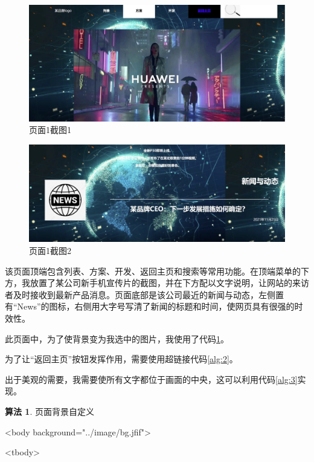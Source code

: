 \documentclass[supercite]{Experimental_Report}
\theoremstyle{definition}
\newtheorem{alg}{算法}[section]
\begin{document}
	\begin{figure}[htb]
		\begin{center}
			\includegraphics[scale=0.43]{images/3-1.jpg}
			\caption{页面1截图1}
			\label{fig3-1}
		\end{center}
	\end{figure}

    \begin{figure}[htb]
    	\begin{center}
    		\includegraphics[scale=0.43]{images/3-2.jpg}
    		\caption{页面1截图2}
    		\label{fig3-2}
    	\end{center}
    \end{figure}
	
	该页面顶端包含列表、方案、开发、返回主页和搜索等常用功能。在顶端菜单的下方，我放置了某公司新手机宣传片的截图，并在下方配以文字说明，让网站的来访者及时接收到最新产品消息。页面底部是该公司最近的新闻与动态，左侧置有“News”的图标，右侧用大字号写清了新闻的标题和时间，使网页具有很强的时效性。
	
    此页面中，为了使背景变为我选中的图片，我使用了代码\ref{alg:1}。
    
    为了让“返回主页”按钮发挥作用，需要使用超链接代码\ref{alg:2}。
    
    出于美观的需要，我需要使所有文字都位于画面的中央，这可以利用代码\ref{alg:3}实现。
	
	\begin{shaded*}\begin{alg}{页面背景自定义}
			\label{alg:1}
			\begin{algorithmic}
			<body background="../image/bg.jfif">
			
			<tbody>
			\end{algorithmic}
	\end{alg}\end{shaded*}
\end{document}
